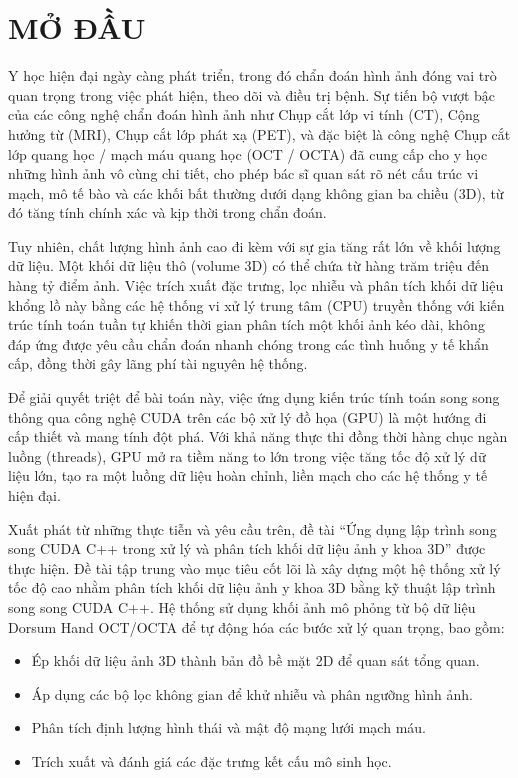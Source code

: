 
\chapter*{MỞ ĐẦU} %
\label{Chapter0} %

Y học hiện đại ngày càng phát triển, trong đó chẩn đoán hình ảnh đóng vai trò quan trọng trong việc phát hiện, theo dõi và điều trị bệnh. Sự tiến bộ vượt bậc của các công nghệ chẩn đoán hình ảnh như Chụp cắt lớp vi tính (CT), Cộng hưởng từ (MRI), Chụp cắt lớp phát xạ (PET), và đặc biệt là công nghệ Chụp cắt lớp quang học / mạch máu quang học (OCT / OCTA) đã cung cấp cho y học những hình ảnh vô cùng chi tiết, cho phép bác sĩ quan sát rõ nét cấu trúc vi mạch, mô tế bào và các khối bất thường dưới dạng không gian ba chiều (3D), từ đó tăng tính chính xác và kịp thời trong chẩn đoán.

Tuy nhiên, chất lượng hình ảnh cao đi kèm với sự gia tăng rất lớn về khối lượng dữ liệu. Một khối dữ liệu thô (volume 3D) có thể chứa từ hàng trăm triệu đến hàng tỷ điểm ảnh. Việc trích xuất đặc trưng, lọc nhiễu và phân tích khối dữ liệu khổng lồ này bằng các hệ thống vi xử lý trung tâm (CPU) truyền thống với kiến trúc tính toán tuần tự khiến thời gian phân tích một khối ảnh kéo dài, không đáp ứng được yêu cầu chẩn đoán nhanh chóng trong các tình huống y tế khẩn cấp, đồng thời gây lãng phí tài nguyên hệ thống.

Để giải quyết triệt để bài toán này, việc ứng dụng kiến trúc tính toán song song thông qua công nghệ CUDA trên các bộ xử lý đồ họa (GPU) là một hướng đi cấp thiết và mang tính đột phá. Với khả năng thực thi đồng thời hàng chục ngàn luồng (threads), GPU mở ra tiềm năng to lớn trong việc tăng tốc độ xử lý dữ liệu lớn, tạo ra một luồng dữ liệu hoàn chỉnh, liền mạch cho các hệ thống y tế hiện đại.

Xuất phát từ những thực tiễn và yêu cầu trên, đề tài ``Ứng dụng lập trình song song CUDA C++ trong xử lý và phân tích khối dữ liệu ảnh y khoa 3D'' được thực hiện. Đề tài tập trung vào mục tiêu cốt lõi là xây dựng một hệ thống xử lý tốc độ cao nhằm phân tích khối dữ liệu ảnh y khoa 3D bằng kỹ thuật lập trình song song CUDA C++. Hệ thống sử dụng khối ảnh mô phỏng từ bộ dữ liệu Dorsum Hand OCT/OCTA để tự động hóa các bước xử lý quan trọng, bao gồm:

\begin{itemize}
    \item Ép khối dữ liệu ảnh 3D thành bản đồ bề mặt 2D để quan sát tổng quan.
    \item Áp dụng các bộ lọc không gian để khử nhiễu và phân ngưỡng hình ảnh.
    \item Phân tích định lượng hình thái và mật độ mạng lưới mạch máu.
    \item Trích xuất và đánh giá các đặc trưng kết cấu mô sinh học.
\end{itemize}
